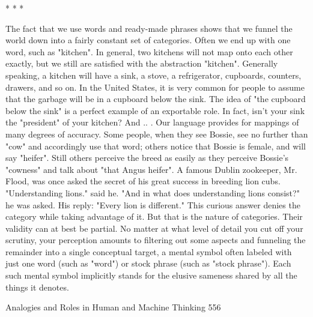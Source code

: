                                        *   *   *

        The fact that we use words and ready-made phrases shows that we funnel the
world down into a fairly constant set of categories. Often we end up with one word,
such as "kitchen". In general, two kitchens will not map onto each other exactly, but
we still are satisfied with the abstraction "kitchen". Generally speaking, a kitchen will
have a sink, a stove, a refrigerator, cupboards, counters, drawers, and so on. In the
United States, it is very common for people to assume that the garbage will be in a
cupboard below the sink. The idea of "the cupboard below the sink" is a perfect
example of an exportable role. In fact, isn't your sink the "president" of your kitchen?
And .. .
        Our language provides for mappings of many degrees of accuracy. Some
people, when they see Bossie, see no further than "cow" and accordingly use that
word; others notice that Bossie is female, and will say "heifer". Still others perceive
the breed as easily as they perceive Bossie's "cowness" and talk about "that Angus
heifer". A famous Dublin zookeeper, Mr. Flood, was once asked the secret of his
great success in breeding lion cubs. "Understanding lions." said he. "And in what does
understanding lions consist?" he was asked. His reply: "Every lion is different." This
curious answer denies the category while taking advantage of it. But that is the nature
of categories. Their validity can at best be partial. No matter at what level of detail
you cut off your scrutiny, your perception amounts to filtering out some aspects and
funneling the remainder into a single conceptual target, a mental symbol often labeled
with just one word (such as "word") or stock phrase (such as "stock phrase"). Each
such mental symbol implicitly stands for the elusive sameness shared by all the things
it denotes.




Analogies and Roles in Human and Machine Thinking                                    556

